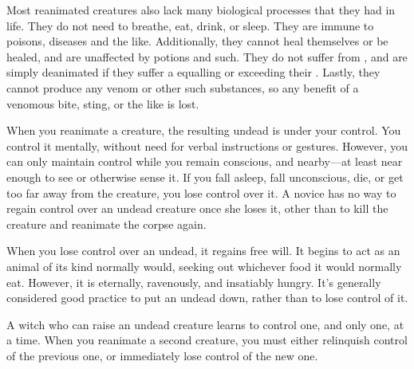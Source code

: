 Most reanimated creatures also lack many biological processes that they had in life.
They do not need to breathe, eat, drink, or sleep.
They are immune to poisons, diseases and the like.
Additionally, they cannot heal themselves or be healed, and are unaffected by potions and such.
They do not suffer from {\shock}, and are simply deanimated if they suffer a {\damagetest} equalling or exceeding their .
Lastly, they cannot produce any venom or other such substances, so any benefit of a venomous bite, sting, or the like is lost.

When you reanimate a creature, the resulting undead is under your control.
You control it mentally, without need for verbal instructions or gestures.
However, you can only maintain control while you remain conscious, and nearby---at least near enough to see or otherwise sense it.
If you fall asleep, fall unconscious, die, or get too far away from the creature, you lose control over it.
A novice  has no way to regain control over an undead creature once she loses it, other than to kill the creature and reanimate the corpse again.

When you lose control over an undead, it regains free will.
It begins to act as an animal of its kind normally would, seeking out whichever food it would normally eat.
However, it is eternally, ravenously, and insatiably hungry.
It's generally considered good practice to put an undead down, rather than to lose control of it.

A witch who can raise an undead creature learns to control one, and only one, at a time.
When you reanimate a second creature, you must either relinquish control of the previous one, or immediately lose control of the new one.


